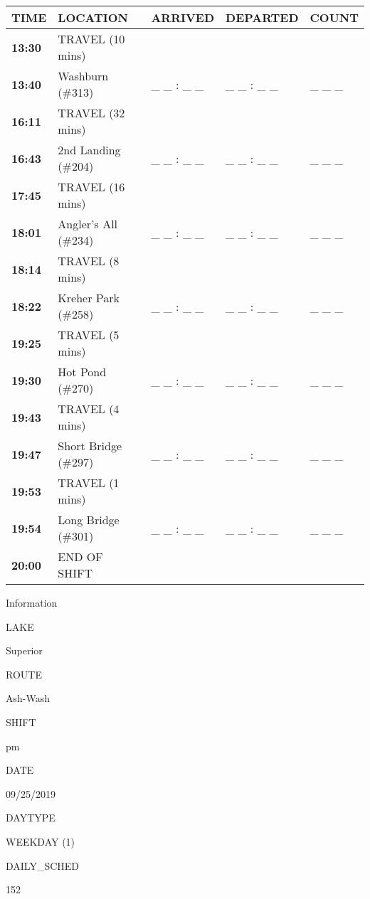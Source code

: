 \documentclass[]{article}
\begin{document}
\begin{tabular}{>{\bfseries}lllll}
\toprule
\textbf{TIME} & \textbf{LOCATION} & \textbf{ARRIVED} & \textbf{DEPARTED} & \textbf{COUNT}\\
\midrule
13:30 & TRAVEL (10 mins) &  &  & \\
13:40 & Washburn (\#313) & \_ \_ : \_ \_ & \_ \_ : \_ \_ & \_ \_ \_\\
16:11 & TRAVEL (32 mins) &  &  & \\
16:43 & 2nd Landing (\#204) & \_ \_ : \_ \_ & \_ \_ : \_ \_ & \_ \_ \_\\
17:45 & TRAVEL (16 mins) &  &  & \\
18:01 & Angler's All (\#234) & \_ \_ : \_ \_ & \_ \_ : \_ \_ & \_ \_ \_\\
18:14 & TRAVEL (8 mins) &  &  & \\
18:22 & Kreher Park (\#258) & \_ \_ : \_ \_ & \_ \_ : \_ \_ & \_ \_ \_\\
19:25 & TRAVEL (5 mins) &  &  & \\
19:30 & Hot Pond (\#270) & \_ \_ : \_ \_ & \_ \_ : \_ \_ & \_ \_ \_\\
19:43 & TRAVEL (4 mins) &  &  & \\
19:47 & Short Bridge (\#297) & \_ \_ : \_ \_ & \_ \_ : \_ \_ & \_ \_ \_\\
19:53 & TRAVEL (1 mins) &  &  & \\
19:54 & Long Bridge (\#301) & \_ \_ : \_ \_ & \_ \_ : \_ \_ & \_ \_ \_\\
20:00 & END OF SHIFT &  &  & \\
\bottomrule
\end{tabular}\newpage

Information

LAKE

Superior

ROUTE

Ash-Wash

SHIFT

pm

DATE

09/25/2019

DAYTYPE

WEEKDAY (1)

DAILY\_SCHED

152

\vspace{24pt}
\end{document}
